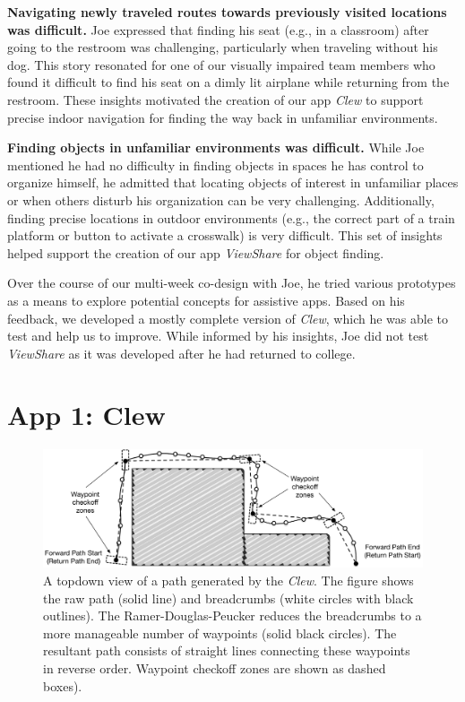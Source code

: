 \documentclass[chi_draft]{sigchi}
\begin{document}
\textbf{Navigating newly traveled routes towards previously visited locations was difficult.} Joe expressed that finding his seat (e.g., in a classroom) after going to the restroom was challenging, particularly when traveling without his dog. This story resonated for one of our visually impaired team members who found it difficult to find his seat on a dimly lit airplane while returning from the restroom. These insights motivated the creation of our app \emph{Clew} to support precise indoor navigation for finding the way back in unfamiliar environments.

\textbf{Finding objects in unfamiliar environments was difficult.} While Joe mentioned he had no difficulty in finding objects in spaces he has control to organize himself, he admitted that locating objects of interest in unfamiliar places or when others disturb his organization can be very challenging. Additionally, finding precise locations in outdoor environments (e.g., the correct part of a train platform or button to activate a crosswalk) is very difficult.  This set of insights helped support the creation of our app \emph{ViewShare} for object finding.

Over the course of our multi-week co-design with Joe, he tried various prototypes as a means to explore potential concepts for assistive apps.  Based on his feedback, we developed a mostly complete version of \emph{Clew}, which he was able to test and help us to improve.  While informed by his insights, Joe did not test \emph{ViewShare} as it was developed after he had returned to college.

\section{App 1: Clew}


\begin{figure}
\begin{center}
\includegraphics[width=\linewidth]{Figures/samplepath}
\end{center}
\caption{A topdown view of a path generated by the \emph{Clew}.  The figure shows the raw path (solid line) and breadcrumbs (white circles with black outlines).  The Ramer-Douglas-Peucker reduces the breadcrumbs to a more manageable number of waypoints (solid black circles).  The resultant path consists of straight lines connecting these waypoints in reverse order.  Waypoint checkoff zones are shown as dashed boxes).\label{fig:samplepath}}
\end{figure}
\end{document}
